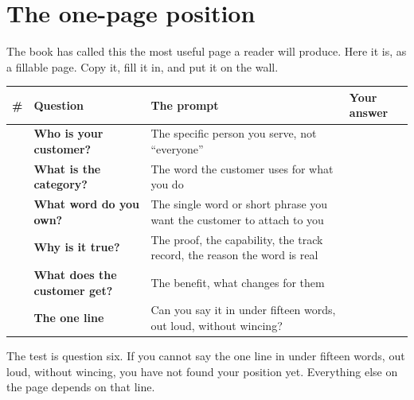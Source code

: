 \documentclass[10pt,twoside,openany]{memoir}
\newcommand{\needspacehead}{\needspace{4\baselineskip}}
\let\oldsection\section
\renewcommand{\section}{\needspacehead\oldsection}
\renewcommand{\arraystretch}{1.1}
\begin{document}
{{{{\section{The one-page position}\label{the-one-page-position}

The book has called this the most useful page a reader will produce.
Here it is, as a fillable page. Copy it, fill it in, and put it on the
wall.

{\def\LTcaptype{none} %
{\renewcommand{\arraystretch}{0.9}\begin{longtable}[]{@{}
  >{\raggedright\arraybackslash}p{}
  >{\raggedright\arraybackslash}p{}
  >{\raggedright\arraybackslash}p{}
  >{\raggedright\arraybackslash}p{}@{}}
\toprule\noalign{}
\begin{minipage}[b]{\linewidth}\raggedright
\#
\end{minipage} & \begin{minipage}[b]{\linewidth}\raggedright
Question
\end{minipage} & \begin{minipage}[b]{\linewidth}\raggedright
The prompt
\end{minipage} & \begin{minipage}[b]{\linewidth}\raggedright
Your answer
\end{minipage} \\
\midrule\noalign{}
\endhead
\bottomrule\noalign{}
\endlastfoot
1 & \textbf{Who is your customer?} & The specific person you serve, not
``everyone'' & \\
2 & \textbf{What is the category?} & The word the customer uses for what
you do & \\
3 & \textbf{What word do you own?} & The single word or short phrase you
want the customer to attach to you & \\
4 & \textbf{Why is it true?} & The proof, the capability, the track
record, the reason the word is real & \\
5 & \textbf{What does the customer get?} & The benefit, what changes for
them & \\
6 & \textbf{The one line} & Can you say it in under fifteen words, out
loud, without wincing? & \\
\end{longtable}
}

The test is question six. If you cannot say the one line in under
fifteen words, out loud, without wincing, you have not found your
position yet. Everything else on the page depends on that line.

}}}}}
\end{document}
